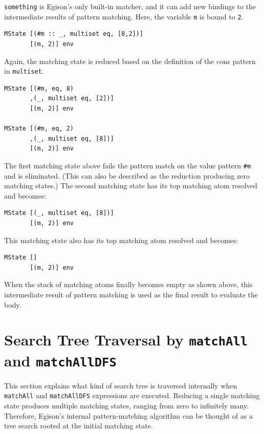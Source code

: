 \lstinline{something} is Egison's only built-in matcher, and it can add new bindings to the intermediate results of pattern matching.
Here, the variable \lstinline{m} is bound to \lstinline{2}.
\begin{lstlisting}[language=egison,numbers=none]
MState [(#m :: _, multiset eq, [8,2])]
       [(m, 2)] env
\end{lstlisting}
Again, the matching state is reduced based on the definition of the cons pattern in \lstinline{multiset}.
\begin{lstlisting}[language=egison,numbers=none]
MState [(#m, eq, 8)
       ,(_, multiset eq, [2])]
       [(m, 2)] env

MState [(#m, eq, 2)
       ,(_, multiset eq, [8])]
       [(m, 2)] env
\end{lstlisting}
The first matching state above fails the pattern match on the value pattern \lstinline{#m} and is eliminated. (This can also be described as the reduction producing zero matching states.)
The second matching state has its top matching atom resolved and becomes:
\begin{lstlisting}[language=egison,numbers=none]
MState [(_, multiset eq, [8])]
       [(m, 2)] env
\end{lstlisting}
This matching state also has its top matching atom resolved and becomes:
\begin{lstlisting}[language=egison,numbers=none]
MState []
       [(m, 2)] env
\end{lstlisting}
When the stack of matching atoms finally becomes empty as shown above, this intermediate result of pattern matching is used as the final result to evaluate the body.

\section{Search Tree Traversal by \texttt{matchAll} and \texttt{matchAllDFS}}\label{mechanism-traversal}

This section explains what kind of search tree is traversed internally when \lstinline{matchAll} and \lstinline{matchAllDFS} expressions are executed.
Reducing a single matching state produces multiple matching states, ranging from zero to infinitely many.
Therefore, Egison's internal pattern-matching algorithm can be thought of as a tree search rooted at the initial matching state.

